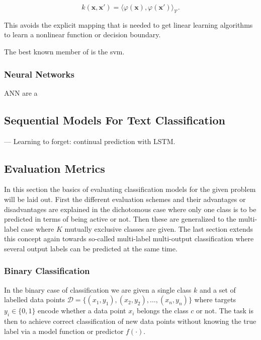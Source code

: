 \begin{equation}
  k(\mathbf {x} ,\mathbf {x'} )=\langle \varphi (\mathbf {x} ),\varphi (\mathbf {x'} )\rangle _{\mathcal {V}}.
\end{equation}

This avoids the explicit mapping that is needed to get linear learning algorithms to learn a nonlinear function or decision boundary.

The best known member of is the \gls{svm}.

\subsubsection{Neural Networks}
\label{subs:Neural Networks}

\gls{ANN} are a


\subsection{Sequential Models For Text Classification}
\label{sub:Sequential Models For Text Classification}

\cite{Gers:1999aa} --- Learning to forget: continual prediction with LSTM.

\subsection{Evaluation Metrics}
\label{sub:Evaluation Metrics}

In this section the basics of evaluating classification models for the given problem will be laid out. First the different evaluation schemes and their advantages or disadvantages are explained in the dichotomous case where only one class is to be predicted in terms of being active or not. Then these are generalized to the multi-label case where $K$ mutually exclusive classes are given. The last section extends this concept again towards so-called multi-label multi-output classification where several output labels can be predicted at the same time.

\subsubsection*{Binary Classification}
\label{subs:Binary Classification}

In the binary case of classification we are given a single class $k$ and a set of labelled data points $\mathcal{D} = \{ (x_1, y_1), (x_2, y_2), \ldots, (x_n, y_n) \}$ where targets $y_i \in \{0, 1\}$ encode whether a data point $x_i$ belongs the class $c$ or not. The task is then to achieve correct classification of new data points without knowing the true label via a model function or predictor $f(\cdot)$.

